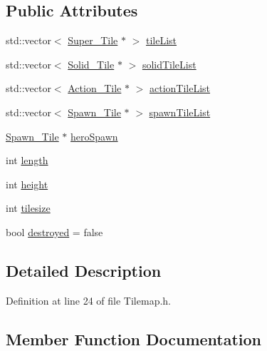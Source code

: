 \subsection*{Public Attributes}
\begin{DoxyCompactItemize}
\item 
std\+::vector$<$ \hyperlink{class_super___tile}{Super\+\_\+\+Tile} $\ast$ $>$ \hyperlink{class_tilemap_a49439fd862d03bdcc26d0c3b5156bc7a}{tile\+List}
\item 
std\+::vector$<$ \hyperlink{class_solid___tile}{Solid\+\_\+\+Tile} $\ast$ $>$ \hyperlink{class_tilemap_aecd9cc5f70702439e13fd6213d176f14}{solid\+Tile\+List}
\item 
std\+::vector$<$ \hyperlink{class_action___tile}{Action\+\_\+\+Tile} $\ast$ $>$ \hyperlink{class_tilemap_ad855bfd20bf768d4f712fe40c5fcaeea}{action\+Tile\+List}
\item 
std\+::vector$<$ \hyperlink{class_spawn___tile}{Spawn\+\_\+\+Tile} $\ast$ $>$ \hyperlink{class_tilemap_a41ae114e32893255ef339dd26c635039}{spawn\+Tile\+List}
\item 
\hyperlink{class_spawn___tile}{Spawn\+\_\+\+Tile} $\ast$ \hyperlink{class_tilemap_a0b9b8cb0dae83e1729ac5d1cc8411395}{hero\+Spawn}
\item 
int \hyperlink{class_tilemap_a20a5ecfd38a3612d4294eb19da4f36ea}{length}
\item 
int \hyperlink{class_tilemap_a65d3108ef1805edef0df66843e8d5e6a}{height}
\item 
int \hyperlink{class_tilemap_a07d9546ed98a4da502902ebaa1d774ca}{tilesize}
\item 
bool \hyperlink{class_tilemap_af966f7c50449d758cb11abdec5767f64}{destroyed} = false
\end{DoxyCompactItemize}


\subsection{Detailed Description}


Definition at line 24 of file Tilemap.\+h.



\subsection{Member Function Documentation}
\hypertarget{class_tilemap_a20ae966645360ac69d313811539dcbcc}{}\label{class_tilemap_a20ae966645360ac69d313811539dcbcc} 
